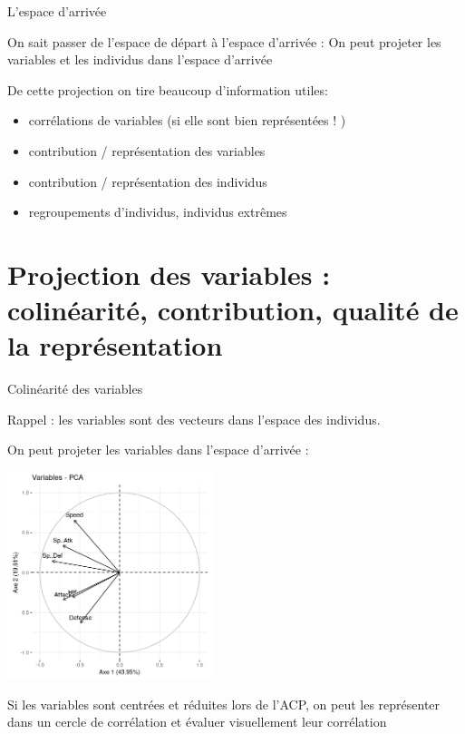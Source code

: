 \documentclass{beamer}
\begin{document}
\begin{frame}{L'espace d'arrivée}

On sait passer de l'espace de départ à l'espace d'arrivée : 
On peut \alert{projeter} les variables et les individus dans l'espace d'arrivée

\medskip

De cette projection on tire beaucoup d'information utiles: 


\begin{itemize}
\item \alert{corrélations} de variables (si elle sont bien représentées ! )
\item \alert{contribution / représentation}  des variables 
\item \alert{contribution / représentation} des individus 
\item \alert{regroupements} d'individus, individus extrêmes
\end{itemize}
\end{frame}



\section{Projection des variables : colinéarité, contribution, qualité de la représentation}



\begin{frame}{Colinéarité des variables}

Rappel : les variables sont des vecteurs dans l'espace des individus. 

On peut projeter les variables dans l'espace d'arrivée : 

\begin{center}
\includegraphics[width=0.45\textwidth,keepaspectratio]{img/cercle_trigo_ACP_var.png}
\end{center}
\begin{spacing}{0.7}
\begin{small}
Si les variables sont \alert{centrées et réduites} lors de l'ACP, on peut les représenter dans un \alert{cercle de corrélation} et évaluer visuellement leur  corrélation
\end{small}
\end{spacing}

\end{frame}
\end{document}
